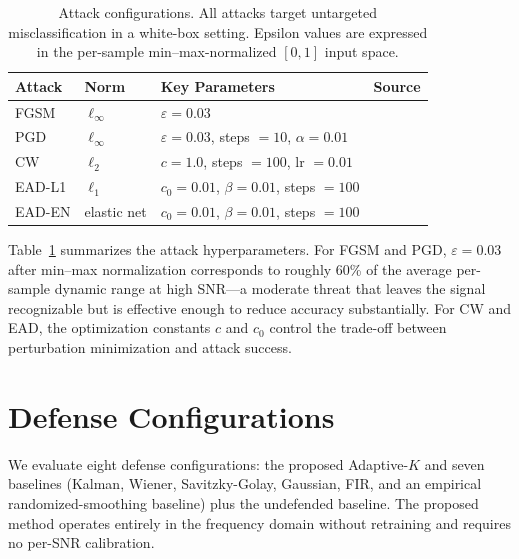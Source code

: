 \begin{table}[!ht]
\caption{Attack configurations. All attacks target untargeted
  misclassification in a white-box setting. Epsilon values are expressed
  in the per-sample min--max-normalized $[0, 1]$ input space.}
\label{tab:attacks}
\centering
\small
\begin{tabular}{llll}
\toprule
Attack & Norm & Key Parameters & Source \\
\midrule
FGSM   & $\ell_\infty$ & $\varepsilon = 0.03$                       & \cite{goodfellow2015fgsm} \\
PGD    & $\ell_\infty$ & $\varepsilon = 0.03$, steps $= 10$, $\alpha = 0.01$ & \cite{madry2018pgd} \\
CW     & $\ell_2$      & $c = 1.0$, steps $= 100$, lr $= 0.01$       & \cite{carlini2017towards} \\
EAD-L1 & $\ell_1$      & $c_0 = 0.01$, $\beta = 0.01$, steps $= 100$ & \cite{chen2020ead} \\
EAD-EN & elastic net   & $c_0 = 0.01$, $\beta = 0.01$, steps $= 100$ & \cite{chen2020ead} \\
\bottomrule
\end{tabular}
\end{table}

Table~\ref{tab:attacks} summarizes the attack hyperparameters. For FGSM and
PGD, $\varepsilon = 0.03$ after min--max normalization corresponds to
roughly 60\% of the average per-sample dynamic range at high SNR---a
moderate threat that leaves the signal recognizable but is effective enough
to reduce accuracy substantially. For CW and EAD, the optimization
constants $c$ and $c_0$ control the trade-off between perturbation
minimization and attack success.

\section{Defense Configurations}

We evaluate eight defense configurations: the proposed Adaptive-$K$
and seven baselines (Kalman, Wiener, Savitzky-Golay, Gaussian, FIR, and
an empirical randomized-smoothing baseline) plus the undefended baseline.
The proposed method operates entirely in the frequency domain without
retraining and requires no per-SNR calibration.

